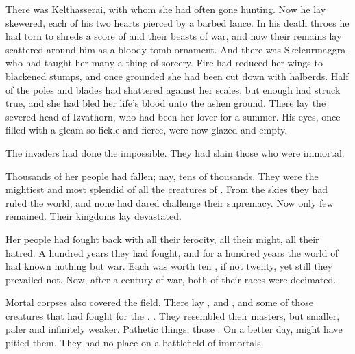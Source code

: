 
There was Kelthasserai, with whom she had often gone hunting. 
Now he lay skewered, each of his two hearts pierced by a barbed  lance. 
In his death throes he had torn to shreds a score of \resphain{} and their beasts of war, and now their remains lay scattered around him as a bloody tomb ornament. 
And there was Skelcurmaggra, who had taught her many a thing of sorcery. 
Fire had reduced her wings to blackened stumps, and once grounded she had been cut down with halberds. 
Half of the poles and blades had shattered against her scales, but enough had struck true, and she had bled her life's blood unto the ashen ground. 
There lay the severed head of Izvathorn, who had been her lover for a summer. 
His eyes, once filled with a gleam so fickle and fierce, were now glazed and empty. 

The invaders had done the impossible. 
They had slain those who were immortal. 


Thousands of her people had fallen; nay, tens of thousands. 
They were the mightiest and most splendid of all the creatures of \Miith{}. From the skies they had ruled the world, and none had dared challenge their supremacy. 
Now only few remained. 
Their kingdoms lay devastated. 


Her people had fought back with all their ferocity, all their might, all their hatred. 
A hundred years they had fought, and for a hundred years the world of \Miith{} had known nothing but war. 
Each \dragon{} was worth ten \resphain{}, if not twenty, yet still they prevailed not. 
Now, after a century of war, both of their races were decimated. 

Mortal corpses also covered the field. 
There lay , and , and some of those creatures that had fought for the \resphain. 
. 
They resembled their \resphan{} masters, but smaller, paler and infinitely weaker. 
Pathetic things, those \humans. 
On a better day, \Cryocas{} might have pitied them. 
They had no place on a battlefield of immortals. 

